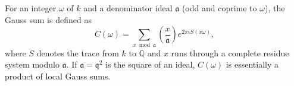 For an integer $\omega$ of $k$ and a denominator ideal $\mathfrak{a}$ (odd and coprime to $\omega$), the Gauss sum is defined as
$$C(\omega) = \sum_{x \bmod \mathfrak{a}} \left(\frac{x}{\mathfrak{a}}\right) e^{2\pi i S(x\omega)},$$
where $S$ denotes the trace from $k$ to $\mathbb{Q}$ and $x$ runs through a complete residue system modulo $\mathfrak{a}$. If $\mathfrak{a} = \mathfrak{q}^2$ is the square of an ideal, $C(\omega)$ is essentially a product of local Gauss sums.
